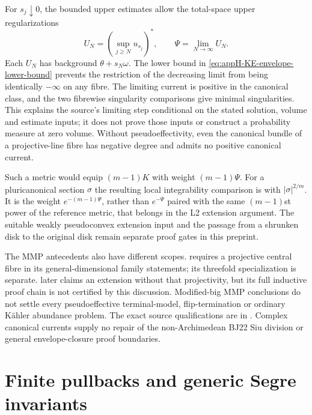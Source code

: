 For $s_j\downarrow0$, the bounded upper estimates allow the total-space
upper regularizations
\begin{equation*}
 U_N=\left(\sup_{j\geq N}u_{s_j}\right)^*,
 \qquad \Psi=\lim_{N\to\infty}U_N.
\tag{H.79}\label{eq:appH-KE-tail-upper-limit}
\end{equation*}
Each $U_N$ has background $\theta+s_N\omega$. The lower bound
in \eqref{eq:appH-KE-envelope-lower-bound} prevents the restriction
of the decreasing limit from being identically $-\infty$ on any
fibre. The limiting current is positive in the canonical class,
and the two fibrewise singularity comparisons give minimal
singularities. This explains the source's limiting step conditional
on the stated solution, volume and estimate inputs; it does not
prove those inputs or construct a probability measure at zero volume.
Without pseudoeffectivity, even the canonical bundle of a
projective-line fibre has negative degree and admits no positive
canonical current.

Such a metric would equip $(m-1)K$ with weight $(m-1)\Psi$.
For a pluricanonical section $\sigma$ the resulting local integrability
comparison is with $|\sigma|^{2/m}$. It is the weight
$e^{-(m-1)\Psi}$, rather than $e^{-\Psi}$ paired with the same
$(m-1)$st power of the reference metric, that belongs in the L2
extension argument. The suitable weakly pseudoconvex extension
input and the passage from a shrunken disk to the original disk
remain separate proof gates in this preprint.

The MMP antecedents also have different scopes.
\cite{HaconLiRao26AdjointV2} requires a projective central fibre
in its general-dimensional family statements; its threefold
specialization is separate. \cite{HaconXie26MMPV1} later claims
an extension without that projectivity, but its full inductive
proof chain is not certified by this discussion. Modified-big
MMP conclusions do not settle every pseudoeffective terminal-model,
flip-termination or ordinary K\"ahler abundance problem.
The exact source qualifications are in
. Complex canonical
currents supply no repair of the non-Archimedean BJ22 Siu division
or general envelope-closure proof boundaries.

\section{Finite pullbacks and generic Segre invariants}
\label{sec:appH-finite-pullback-Segre}

